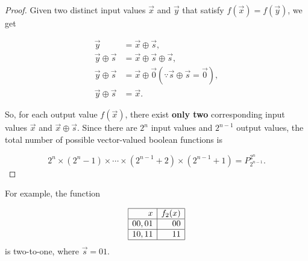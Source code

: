 \begin{proof}
Given two distinct input values $\vec{x}$ and $\vec{y}$ that satisfy $f(\vec{x}) = f(\vec{y})$, we get

\begin{equation}
\begin{aligned}
	\vec{y} & = \vec{x} \oplus \vec{s}, \\
	\vec{y} \oplus \vec{s} & = \vec{x} \oplus \vec{s} \oplus \vec{s}, \\
	\vec{y} \oplus \vec{s} & = \vec{x} \oplus \vec{0} (\because \vec{s} \oplus \vec{s} = \vec{0}), \\
	\vec{y} \oplus \vec{s} & = \vec{x}.
\end{aligned}
\end{equation}

So, for each output value $f(\vec{x})$, there exist \textbf{only two} corresponding input values $\vec{x}$ and $\vec{x} \oplus \vec{s}$. Since there are $2^n$ input values and $2^{n-1}$ output values, the total number of possible vector-valued boolean functions is

\begin{equation}
    2^n \times (2^n-1) \times \cdots \times (2^{n-1}+2) \times (2^{n-1}+1) = P^{2^n}_{2^{n-1}}.
\end{equation}
\end{proof}
For example, the function 

\begin{equation}
    \begin{array}{|r|r|}
	\hline x & f_2(x) \\
	\hline 00,01 & 00 \\
	\hline 10,11 & 11 \\
	\hline
\end{array}
\end{equation}
is two-to-one, where $\vec{s}=01$.
